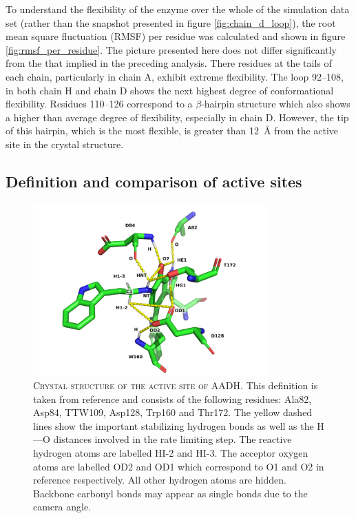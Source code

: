 To understand the flexibility of the enzyme over the whole of the simulation data set (rather than the snapshot presented in figure \ref{fig:chain_d_loop}), the root mean square fluctuation (RMSF) per residue was calculated and shown in figure \ref{fig:rmsf_per_residue}. The picture presented here does not differ significantly from the that implied in the preceding analysis. There residues at the tails of each chain, particularly in chain A, exhibit extreme flexibility. The loop \numrange[range-phrase=\text{--}]{92}{108}, in both chain H and chain D shows the next highest degree of conformational flexibility. Residues \numrange[range-phrase=\text{--}]{110}{126} correspond to a $\beta$-hairpin structure which also shows a higher than average degree of flexibility, especially in chain D.  However, the tip of this hairpin, which is the most flexible, is greater than \SI{12}{\angstrom} from the active site in the crystal structure.  


\subsection{Definition and comparison of active sites}\label{sec:active_site_comparison}

\begin{figure}
    \centering
    \includegraphics[width=0.8\textwidth]{chapters/aadh/figures/aadh_active_site.png}
    \caption[Crystal structure of the active site of AADH]{\textsc{Crystal structure of the active site of AADH}. This definition is taken from reference \cite{ranaghanInitioQMMM2017} and consists of the following residues: Ala82, Asp84, TTW109, Asp128, Trp160 and Thr172. The yellow dashed lines show the important stabilizing hydrogen bonds as well as the H---O distances involved in the rate limiting step.  The reactive hydrogen atoms are labelled HI-2 and HI-3. The acceptor oxygen atoms are labelled OD2 and OD1 which correspond to O1 and O2 in reference \cite{masgrauAtomicDescriptionEnzyme2006} respectively. All other hydrogen atoms are hidden. Backbone carbonyl bonds may appear as single bonds due to the camera angle.}
    \label{fig:aadh_active_site}
\end{figure}

